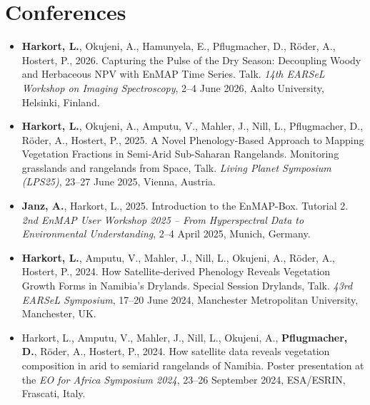\documentclass[10pt]{article} %
\begin{document}

\vspace{6mm}
\section{Conferences}

\begin{itemize}[leftmargin=0.3cm, itemsep=6pt]
\item \textbf{Harkort, L.}, Okujeni, A., Hamunyela, E., Pflugmacher, D., Röder, A., Hostert, P., 2026. Capturing the Pulse of the Dry Season: Decoupling Woody and Herbaceous NPV with EnMAP Time Series. Talk. \textit{14th EARSeL Workshop on Imaging Spectroscopy}, 2--4 June 2026, Aalto University, Helsinki, Finland.
\item \textbf{Harkort, L.}, Okujeni, A., Amputu, V., Mahler, J., Nill, L., Pflugmacher, D., Röder, A., Hostert, P., 2025. A Novel Phenology-Based Approach to Mapping Vegetation Fractions in Semi-Arid Sub-Saharan Rangelands. Monitoring grasslands and rangelands from Space, Talk. \textit{Living Planet Symposium (LPS25)}, 23--27 June 2025, Vienna, Austria.
\item \textbf{Janz, A.}, Harkort, L., 2025. Introduction to the EnMAP-Box. Tutorial 2. \textit{2nd EnMAP User Workshop 2025 -- From Hyperspectral Data to Environmental Understanding}, 2--4 April 2025, Munich, Germany.
\item \textbf{Harkort, L.}, Amputu, V., Mahler, J., Nill, L., Okujeni, A., Röder, A., Hostert, P., 2024. How Satellite-derived Phenology Reveals Vegetation Growth Forms in Namibia's Drylands. Special Session Drylands, Talk. \textit{43rd EARSeL Symposium}, 17--20 June 2024, Manchester Metropolitan University, Manchester, UK.
\item Harkort, L., Amputu, V., Mahler, J., Nill, L., Okujeni, A., \textbf{Pflugmacher, D.}, Röder, A., Hostert, P., 2024. How satellite data reveals vegetation composition in arid to semiarid rangelands of Namibia. Poster presentation at the \textit{EO for Africa Symposium 2024}, 23--26 September 2024, ESA/ESRIN, Frascati, Italy.
\end{itemize}

\end{document}
